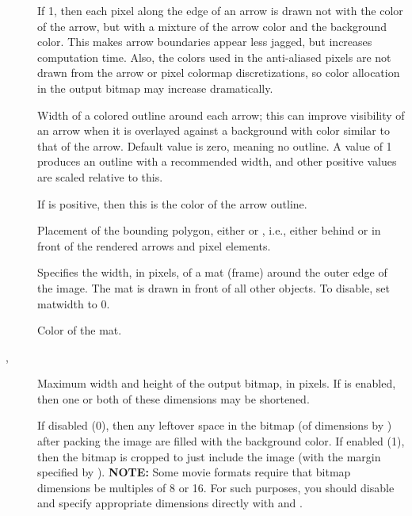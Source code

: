 \begin{description}
\item[]
 If 1, then each pixel along the edge of an arrow is
 drawn not with the color of the arrow, but with a mixture of the arrow
 color and the background color.  This makes arrow boundaries appear
 less jagged, but increases computation time.  Also, the colors used in
 the anti-aliased pixels are not drawn from the arrow or pixel colormap
 discretizations, so color allocation in the output bitmap may increase
 dramatically.
\item[]
 Width of a colored outline around each arrow; this can improve
 visibility of an arrow when it is overlayed against a background with
 color similar to that of the arrow.  Default value is zero, meaning no
 outline.  A value of 1 produces an outline with a recommended width,
 and other positive values are scaled relative to this.
\item[]
 If  is positive, then this is the color of the
 arrow outline.
\item[]
 Placement of the bounding polygon, either  or ,
 i.e., either behind or in front of the rendered arrows and pixel
 elements.
\item[]
 Specifies the width, in pixels, of a mat (frame) around the outer edge
 of the image.  The mat is drawn in front of all other objects.  To
 disable, set matwidth to 0.
\item[]
 Color of the mat.
\item[, ]
 Maximum width and height of the output bitmap, in pixels.  If
  is enabled, then one or both of these dimensions may be
 shortened.
\item[]
 If disabled (0), then any leftover space in the bitmap (of dimensions
  by ) after packing the image are filled
 with the background color.  If enabled (1), then the bitmap is cropped
 to just include the image (with the margin specified by
 ).  {\bf NOTE:} Some movie formats require that
 bitmap dimensions be multiples of 8 or 16.  For such purposes, you
 should disable  and specify appropriate dimensions
 directly with  and .
\end{description}

